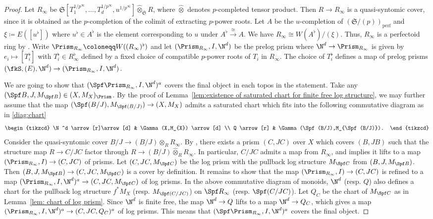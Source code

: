 \begin{proof}
Let $R_{\infty}$ be $\mathfrak{S}[T_1^{1/p^{\infty}}, \ldots, T_d^{1/p^{\infty}}, u^{1/p^{\infty}}]\widehat{\otimes}_{\mathfrak{S}} R$, where $\widehat{\otimes}$ denotes $p$-completed tensor product. Then $R \rightarrow R_{\infty}$ is a quasi-syntomic cover, since it is obtained as the $p$-completion of the colimit of extracting $p$-power roots. Let $A$ be the $u$-completion of $(\mathfrak{S}/(p))_{\mathrm{perf}}$ and $\xi \coloneqq E([u^{\flat}])$ where $u^{\flat} \in A^{\flat}$ is the element corresponding to $u$ under $A^\flat \xrightarrow{\cong} A$. We have $R_{\infty} \cong W(A^\flat)/(\xi)$. Thus, $R_{\infty}$ is a perfectoid ring by \cite[Lem.~3.6]{bhatt-iyengar-ma-regular-rings-perfectoid}. Write $\Prism_{R_\infty}\coloneqq W((R_\infty)^\flat)$ and let $(\Prism_{R_\infty}, I,\N^d)$ be the prelog prism where $\N^d \to \Prism_{R_\infty}$ is given by $e_i \mapsto [T_i^\flat]$ with $T_i^\flat \in R^\flat_\infty$ defined by a fixed choice of compatible $p$-power roots of $T_i$ in $R_\infty$. 
The choice of $T_i^\flat$ defines a map of prelog prisms $(\fkS,(E),\N^d) \to (\Prism_{R_\infty},I,\N^d)$. 

We are going to show that $(\Spf\Prism_{R_\infty}, I, \N^d)^a$ covers the final object in each topos in the statement. Take any $(\Spf B,J,M_{\Spf B})\in(X,M_X)_\Prism$.  By the proof of Lemma~\ref{lem:existence of saturated chart for finite free log structure}, we may further assume that the map $(\Spf(B/J), M_{\Spf(B/J)}) \to (X,M_X)$ admits a saturated chart which fits into the following commutative diagram as in \eqref{diag:chart}
\[
\begin{tikzcd}
\N^d \arrow[r]\arrow[d] & \Gamma(X,M_{X}) \arrow[d] \\
Q \arrow[r] & \Gamma(\Spf(B/J),M_{\Spf(B/J)}).
\end{tikzcd}
\]  
Consider the quasi-syntomic cover $B/J \to (B/J)\widehat{\otimes}_{R} R_{\infty}$. By \cite[Prop.~7.11(1)]{bhatt-scholze-prismaticcohom}, there exists a prism $(C,JC)$ over $X$ which covers $(B, JB)$ such that the structure map $R\to C/JC$ factor through $R \to (B/J)\widehat{\otimes}_{R} R_{\infty}$. In particular, $C/JC$ admits a map from $R_{\infty}$, and \cite[Lem.~4.8]{bhatt-scholze-prismaticcohom} implies it lifts to a map $(\Prism_{R_{\infty}},I) \to (C,JC)$ of prisms. Let $(C, JC, M_{\Spf C})$ be the log prism with the pullback log structure $M_{\Spf C}$ from $(B,J,M_{\Spf B})$. Then $(B,J,M_{\Spf B}) \to (C,JC,M_{\Spf C})$ is a cover by definition. It remains to show that the map $(\Prism_{R_\infty}, I) \to (C,JC)$ is refined to a map $(\Prism_{R_\infty}, I, \N^d)^a \to (C,JC,M_{\Spf C})$ of log prisms. In the above commutative diagram of monoids, $\N^d$ (resp. $Q$) also defines a chart for the pullback log structure $f^\ast M_X$ (resp. $M_{\Spf(C/JC)}$) on $\Spf R_\infty$ (resp. $\Spf(C/JC)$). Let $Q_C$ be the chart of $M_{\Spf C}$ as in Lemma~\ref{lem: chart of log prism}. Since $\N^d$ is finite free, the map $\N^d \to Q$ lifts to a map $\N^d \to Q_C$, which gives a map $(\Prism_{R_\infty}, I, \N^d)^a \to (C,JC,Q_C)^a$ of log prisms. This means that $(\Spf\Prism_{R_\infty}, I, \N^d)^a$ covers the final object.
\end{proof}


